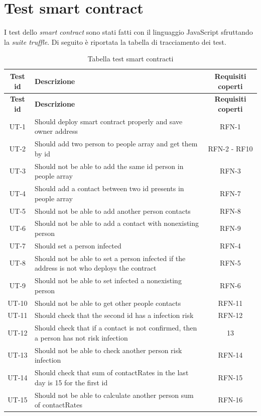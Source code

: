 \section{Test smart contract}
I test dello \textit{smart contract} sono stati fatti con il linguaggio JavaScript sfruttando la \textit{suite truffle}.
Di seguito è riportata la tabella di tracciamento dei test.

\begin{center}
	\begin{longtable}{| c | p{25em} | c |}
		\caption{Tabella test smart contracti}
		\label{tab:test-sci}\\
		\hline
		\textbf{Test id} & \centering\textbf{Descrizione} & \textbf{Requisiti coperti}\\
		\endfirsthead
		\hline
		\textbf{Test id} & \centering\textbf{Descrizione} & \textbf{Requisiti coperti}\\
		\endhead
		\endfoot
		
		\hline
		UT-1     & Should deploy smart contract properly and save owner address & RFN-1 \\
		\hline
		UT-2     & Should add two person to people array and get them by id & RFN-2 - RF10\\
		\hline
		UT-3     & Should not be able to add the same id person in people array & RFN-3 \\
		\hline
		UT-4     & Should add a contact between two id presents in people array & RFN-7 \\
		\hline
		UT-5     & Should not be able to add another person contacts & RFN-8 \\
		\hline
		UT-6     & Should not be able to add a contact with nonexisting person & RFN-9 \\
		\hline
		UT-7     & Should set a person infected & RFN-4 \\
		\hline
		UT-8     & Should not be able to set a person infected if the address is not who deploys the contract & RFN-5 \\
		\hline
		UT-9     & Should not be able to set infected a nonexisting person & RFN-6 \\
		\hline
		UT-10   & Should not be able to get other people contacts & RFN-11 \\
		\hline
		UT-11   & Should check that the second id has a infection risk & RFN-12 \\
		\hline
		UT-12   & Should check that if a contact is not confirmed, then a person has not risk infection &  13\\
		\hline
		UT-13   & Should not be able to check another person risk infection & RFN-14 \\
		\hline
		UT-14   & Should check that sum of contactRates in the last day is 15 for the first id & RFN-15 \\
		\hline
		UT-15   & Should not be able to calculate another person sum of contactRates & RFN-16 \\
		\hline
	\end{longtable}
\end{center}
